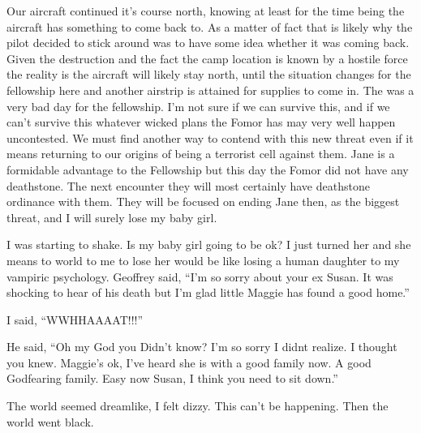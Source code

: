 Our aircraft continued it's course north, knowing at least for the time being the aircraft has something to come back to. As a matter of fact that is likely why the pilot decided to stick around was to have some idea whether it was coming back. Given the destruction and the fact the camp location is known by a hostile force the reality is the aircraft will likely stay north, until the situation changes for the fellowship here and another airstrip is attained for supplies to come in. The was a very bad day for the fellowship. I'm not sure if we can survive this, and if we can't survive this whatever wicked plans the Fomor has may very well happen uncontested. We must find another way to contend with this new threat even if it means returning to our origins of being a terrorist cell against them. Jane is a formidable advantage to the Fellowship but this day the Fomor did not have any deathstone. The next encounter they will most certainly have deathstone ordinance with them. They will be focused on ending Jane then, as the biggest threat, and I will surely lose my baby girl.

I was starting to shake. Is my baby girl going to be ok? I just turned her and she means to world to me to lose her would be like losing a human daughter to my vampiric psychology. Geoffrey said,  ``I'm so sorry about your ex Susan. It was shocking to hear of his death but I'm glad little Maggie has found a good home.''

I said, ``WWHHAAAAT!!!''

He said, ``Oh my God you Didn't know? I'm so sorry I didnt realize. I thought you knew. Maggie's ok, I've heard she is with a good family now. A good Godfearing family. Easy now Susan, I think you need to sit down.''

The world seemed dreamlike, I felt dizzy. This can't be happening. Then the world went black.


 

